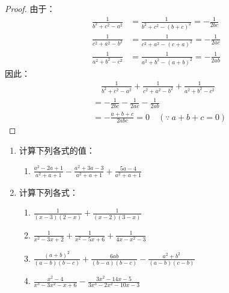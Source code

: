 \begin{proof}
由于：   
\[\begin{split}
    \frac{1}{b^2+c^2-a^2}&= \frac{1}{b^2+c^2-(b+c)^2}=-\frac{1}{2bc} \\
    \frac{1}{c^2+a^2-b^2}&= \frac{1}{c^2+a^2-(c+a)^2}=-\frac{1}{2ac}  \\
    \frac{1}{a^2+b^2-c^2}&=\frac{1}{a^2+b^2-(a+b)^2}=-\frac{1}{2ab}
\end{split}\]
因此：
\[\begin{split}
    &\quad \frac{1}{b^2+c^2-a^2}+\frac{1}{c^2+a^2-b^2}+\frac{1}{a^2+b^2-c^2}\\
    &=-\frac{1}{2bc}-\frac{1}{2ac}-\frac{1}{2ab}\\
&=-\frac{a+b+c}{2abc}=0\quad (\because\ a+b+c=0)
\end{split}\]
\end{proof}

\begin{ex}
\begin{enumerate}
    \item 计算下列各式的值：
  \begin{enumerate}
\item $\frac{a^{2}-2 a+1}{a^{2}+a+1}-\frac{a^{2}+3 a-3}{a^{2}+a+1}+\frac{5 a-4}{a^{2}+a+1}$
    
  \end{enumerate}

  \item 计算下列各式：
\begin{enumerate}
\item $\frac{1}{(x-3)(2-x)}+\frac{1}{(x-2)(3-x)}$
    \item  $\frac{1}{x^{2}-3 x+2}+\frac{1}{x^{2}-5 x+6}+\frac{1}{4 x-x^{2}-3}$
    \item  $\frac{(a+b)^{2}}{(a-b)(b-c)}+\frac{6 a b}{(b-a)(b-c)}-\frac{a^{2}+b^{2}}{(a-b)(c-b)}$
    \item  $\frac{x^{2}-4}{x^{3}-3 x^{2}-x+6}-\frac{3 x^{2}-14 x-5}{3 x^{3}-2 x^{2}-10 x-3}$
\end{enumerate}
\end{enumerate}  
\end{ex}

